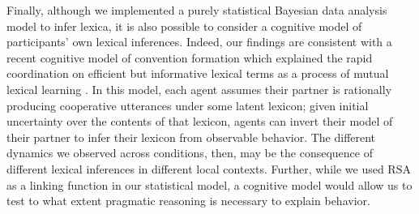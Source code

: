 


Finally, although we implemented a purely statistical Bayesian data analysis model to infer lexica, it is also possible to consider a cognitive model of participants' own lexical inferences. Indeed, our findings are consistent with a recent cognitive model of convention formation which explained the rapid coordination on efficient but informative lexical terms as a process of mutual lexical learning \cite{HawkinsFrankGoodman17_ConventionFormation}. %
In this model, each agent assumes their partner is rationally producing cooperative utterances under some latent lexicon; given initial uncertainty over the contents of that lexicon, agents can invert their model of their partner to infer their lexicon from observable behavior. 
The different dynamics we observed across conditions, then, may be the consequence of different lexical inferences in different local contexts. Further, while we used RSA as a linking function in our statistical model, a cognitive model would allow us to test to what extent pragmatic reasoning is necessary to explain behavior.%

